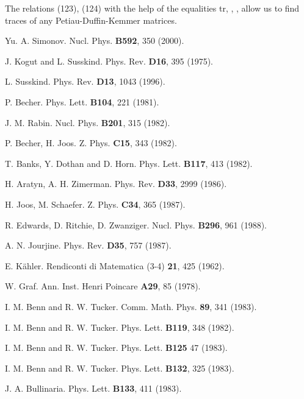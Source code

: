\documentclass[a4paper,12pt]{article}
\begin{document}
The relations (123), (124) with the help of the equalities tr\coordHE{}, \myHighlight{$\delta _{[\mu \nu ][\rho \sigma
]}=\delta _{\mu \rho }\delta _{\nu \sigma }-\delta _{\mu \sigma }\delta
_{\nu \rho }$}\coordHE{}, \coordHE{}, \coordHE{}
allow us to find traces of any Petiau-Duffin-Kemmer matrices.

\begin{thebibliography}{99}
\bibitem{}  Yu. A. Simonov. Nucl. Phys. \textbf{B592}, 350 (2000).

\bibitem{}  J. Kogut and L. Susskind. Phys. Rev. \textbf{D16}, 395 (1975).

\bibitem{}  L. Susskind. Phys. Rev. \textbf{D13}, 1043 (1996).

\bibitem{}  P. Becher. Phys. Lett. \textbf{B104}, 221 (1981).

\bibitem{}  J. M. Rabin. Nucl. Phys. \textbf{B201}, 315 (1982).

\bibitem{}  P. Becher, H. Joos. Z. Phys. \textbf{C15}, 343 (1982).

\bibitem{}  T. Banks, Y. Dothan and D. Horn. Phys. Lett.
\textbf{B117}, 413 (1982).

\bibitem{}  H. Aratyn, A. H. Zimerman. Phys. Rev. \textbf{D33}, 2999 (1986).

\bibitem{}  H. Joos, M. Schaefer. Z. Phys. \textbf{C34}, 365 (1987).

\bibitem{}  R. Edwards, D. Ritchie, D. Zwanziger. Nucl. Phys. \textbf{
B296}, 961 (1988).

\bibitem{}  A. N. Jourjine. Phys. Rev. \textbf{D35}, 757 (1987).

\bibitem{}  E. K\"ahler. Rendiconti di Matematica (3-4) \textbf{21}, 425
(1962).

\bibitem{}  W. Graf. Ann. Inst. Henri Poincare \textbf{A29}, 85 (1978).

\bibitem{}  I. M. Benn and R. W. Tucker. Comm. Math. Phys.
\textbf{89}, 341 (1983).

\bibitem{}  I. M. Benn and R. W. Tucker. Phys. Lett. \textbf{B119},
348 (1982).

\bibitem{}  I. M. Benn and R. W. Tucker. Phys. Lett. \textbf{B125} 47 (1983).

\bibitem{}  I. M. Benn and R. W. Tucker. Phys. Lett. \textbf{B132},
325 (1983).

\bibitem{}  J. A. Bullinaria. Phys. Lett. \textbf{B133}, 411 (1983).


\end{thebibliography}
\end{document}

